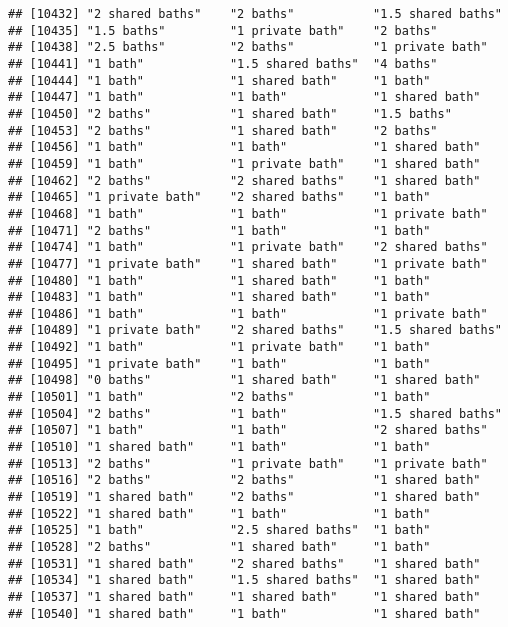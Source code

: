 \documentclass[
]{article}
\begin{document}
\begin{verbatim}
## [10432] "2 shared baths"    "2 baths"           "1.5 shared baths" 
## [10435] "1.5 baths"         "1 private bath"    "2 baths"          
## [10438] "2.5 baths"         "2 baths"           "1 private bath"   
## [10441] "1 bath"            "1.5 shared baths"  "4 baths"          
## [10444] "1 bath"            "1 shared bath"     "1 bath"           
## [10447] "1 bath"            "1 bath"            "1 shared bath"    
## [10450] "2 baths"           "1 shared bath"     "1.5 baths"        
## [10453] "2 baths"           "1 shared bath"     "2 baths"          
## [10456] "1 bath"            "1 bath"            "1 shared bath"    
## [10459] "1 bath"            "1 private bath"    "1 shared bath"    
## [10462] "2 baths"           "2 shared baths"    "1 shared bath"    
## [10465] "1 private bath"    "2 shared baths"    "1 bath"           
## [10468] "1 bath"            "1 bath"            "1 private bath"   
## [10471] "2 baths"           "1 bath"            "1 bath"           
## [10474] "1 bath"            "1 private bath"    "2 shared baths"   
## [10477] "1 private bath"    "1 shared bath"     "1 private bath"   
## [10480] "1 bath"            "1 shared bath"     "1 bath"           
## [10483] "1 bath"            "1 shared bath"     "1 bath"           
## [10486] "1 bath"            "1 bath"            "1 private bath"   
## [10489] "1 private bath"    "2 shared baths"    "1.5 shared baths" 
## [10492] "1 bath"            "1 private bath"    "1 bath"           
## [10495] "1 private bath"    "1 bath"            "1 bath"           
## [10498] "0 baths"           "1 shared bath"     "1 shared bath"    
## [10501] "1 bath"            "2 baths"           "1 bath"           
## [10504] "2 baths"           "1 bath"            "1.5 shared baths" 
## [10507] "1 bath"            "1 bath"            "2 shared baths"   
## [10510] "1 shared bath"     "1 bath"            "1 bath"           
## [10513] "2 baths"           "1 private bath"    "1 private bath"   
## [10516] "2 baths"           "2 baths"           "1 shared bath"    
## [10519] "1 shared bath"     "2 baths"           "1 shared bath"    
## [10522] "1 shared bath"     "1 bath"            "1 bath"           
## [10525] "1 bath"            "2.5 shared baths"  "1 bath"           
## [10528] "2 baths"           "1 shared bath"     "1 bath"           
## [10531] "1 shared bath"     "2 shared baths"    "1 shared bath"    
## [10534] "1 shared bath"     "1.5 shared baths"  "1 shared bath"    
## [10537] "1 shared bath"     "1 shared bath"     "1 shared bath"    
## [10540] "1 shared bath"     "1 bath"            "1 shared bath"    

\end{verbatim}
\end{document}
